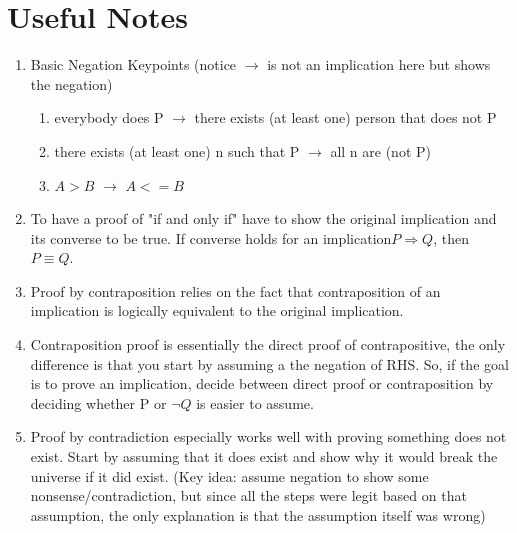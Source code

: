 \documentclass[11pt]{article}
\begin{document}
\section*{Useful Notes}
\begin{enumerate}
\item Basic Negation Keypoints (notice $\rightarrow$ is not an implication here but shows the negation)
\begin{enumerate}
\item everybody does P $\rightarrow$  there exists (at least one) person that does not P
\item there exists (at least one) n such that P $\rightarrow$ all n are (not P)
\item $A > B$ $\rightarrow$ $A<= B$ 
\end{enumerate}

\item To have a proof of "if and only if" have to show the original implication and its converse to be true. If converse holds for an implication$P \Rightarrow Q$, then $ P \equiv Q$.
\item Proof by contraposition relies on the fact that contraposition of an implication is logically equivalent to the original implication.
\item Contraposition proof is essentially the direct proof of contrapositive, the only difference is that you start by assuming a the negation of RHS. So, if the goal is to prove an implication, decide between direct proof or contraposition by deciding whether P or $\neg Q$ is easier to assume.
\item Proof by contradiction especially works well with proving something does not exist. Start by assuming that it does exist and show why it would break the universe if it did exist. (Key idea: assume negation to show some nonsense/contradiction, but since all the steps were legit based on that assumption, the only explanation is that the assumption itself was wrong)



\end{enumerate}
\end{document}
